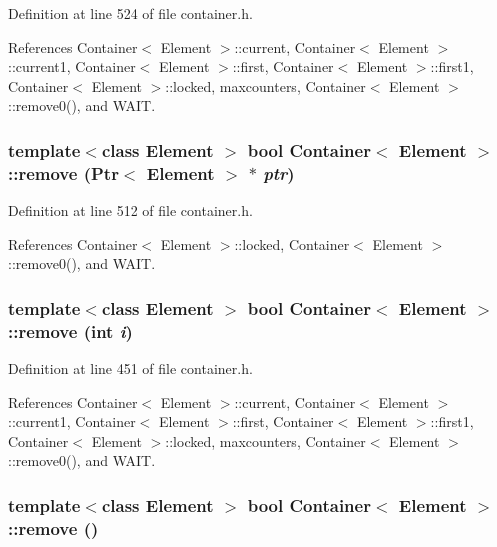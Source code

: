 Definition at line 524 of file container.h.

References Container$<$ Element $>$::current, Container$<$ Element $>$::current1, Container$<$ Element $>$::first, Container$<$ Element $>$::first1, Container$<$ Element $>$::locked, maxcounters, Container$<$ Element $>$::remove0(), and WAIT.\hypertarget{classContainer_1eb390532eb41c1029ad93fec035be1c}{
\subsubsection[{remove}]{\setlength{\rightskip}{0pt plus 5cm}template$<$class Element $>$ bool {\bf Container}$<$ Element $>$::remove ({\bf Ptr}$<$ Element $>$ $\ast$ {\em ptr})}}
\label{classContainer_1eb390532eb41c1029ad93fec035be1c}




Definition at line 512 of file container.h.

References Container$<$ Element $>$::locked, Container$<$ Element $>$::remove0(), and WAIT.\hypertarget{classContainer_b79f3ed8a43ab371b9b1463b0d3da75f}{
\subsubsection[{remove}]{\setlength{\rightskip}{0pt plus 5cm}template$<$class Element $>$ bool {\bf Container}$<$ Element $>$::remove (int {\em i})}}
\label{classContainer_b79f3ed8a43ab371b9b1463b0d3da75f}




Definition at line 451 of file container.h.

References Container$<$ Element $>$::current, Container$<$ Element $>$::current1, Container$<$ Element $>$::first, Container$<$ Element $>$::first1, Container$<$ Element $>$::locked, maxcounters, Container$<$ Element $>$::remove0(), and WAIT.\hypertarget{classContainer_0ea8bb3267b6bef9959ea744bc9b36ea}{
\subsubsection[{remove}]{\setlength{\rightskip}{0pt plus 5cm}template$<$class Element $>$ bool {\bf Container}$<$ Element $>$::remove ()}}
\label{classContainer_0ea8bb3267b6bef9959ea744bc9b36ea}




